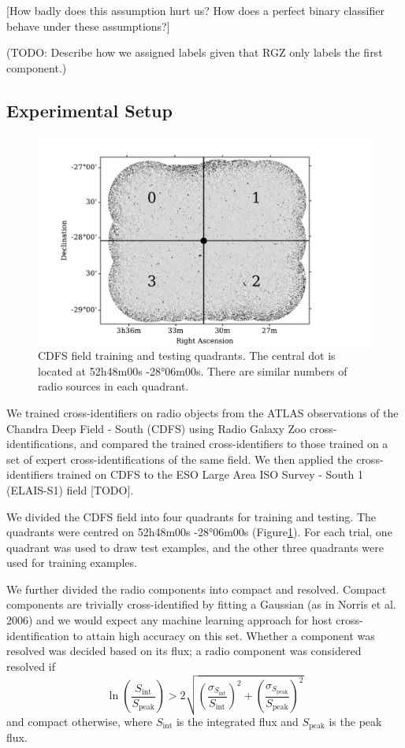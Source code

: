 \documentclass[fleqn,usenatbib,usedcolumn]{mnras}
\newcommand{\text}{\mathrm}
\begin{document}
    {[}How badly does this assumption hurt us? How does a perfect binary
    classifier behave under these assumptions?{]}

    (TODO: Describe how we assigned labels given that RGZ only labels the
    first component.)

  \subsection{Experimental Setup}\label{experimental-setup}

    \begin{figure}
    \centering
    \includegraphics[width=\columnwidth]{images/quadrants.pdf}
    \caption{CDFS field training and testing quadrants. The central dot is
    located at 52h48m00s -28°06m00s. There are similar numbers of radio
    sources in each quadrant.\label{fig:quadrants}}
    \end{figure}

    We trained cross-identifiers on radio objects from the ATLAS
    observations of the Chandra Deep Field - South (CDFS) using Radio Galaxy
    Zoo cross-identifications, and compared the trained cross-identifiers to
    those trained on a set of expert cross-identifications of the same
    field. We then applied the cross-identifiers trained on CDFS to the ESO
    Large Area ISO Survey - South 1 (ELAIS-S1) field {[}TODO{]}.

    We divided the CDFS field into four quadrants for training and testing.
    The quadrants were centred on 52h48m00s -28°06m00s
    ({Figure}\ref{fig:quadrants}). For each trial, one quadrant
    was used to draw test examples, and the other three quadrants were used
    for training examples.

    We further divided the radio components into compact and resolved.
    Compact components are trivially cross-identified by fitting a Gaussian
    (as in Norris et al. 2006) and we would expect any machine learning
    approach for host cross-identification to attain high accuracy on this
    set. Whether a component was resolved was decided based on its flux; a
    radio component was considered resolved if \[
        \ln \left(\frac{S_{\text{int}}}{S_{\text{peak}}}\right) > 2\sqrt{\left(\frac{\sigma_{S_{\text{int}}}}{S_{\text{int}}}\right)^2 + \left(\frac{\sigma_{S_{\text{peak}}}}{S_{\text{peak}}}\right)^2}
    \] and compact otherwise, where \(S_{\text{int}}\) is the integrated
    flux and \(S_{\text{peak}}\) is the peak flux.
\end{document}

